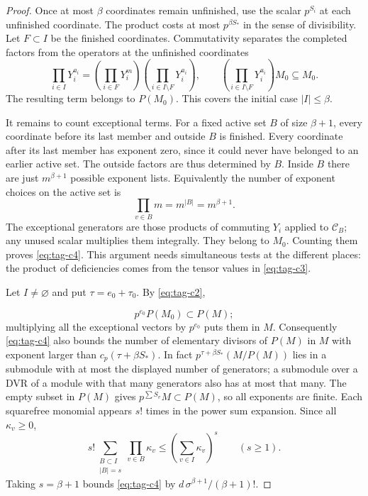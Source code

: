 \begin{proof}

Once at most \(\beta\) coordinates remain unfinished, use the
scalar \(p^{S_i}\) at each unfinished coordinate. The product
costs at most \(p^{\beta S_*}\) in the sense of divisibility.
Let \(F\subset I\) be the finished coordinates. Commutativity separates the completed factors from the operators at the unfinished coordinates
\[
  \prod_{i\in I}Y_i^{a_i}=\left(\prod_{i\in F}Y_i^m\right)\left(\prod_{i\in I\setminus F}Y_i^{a_i}\right),\qquad \left(\prod_{i\in I\setminus F}Y_i^{a_i}\right)M_0\subseteq M_0.
\]
 The resulting term belongs
to \(P(M_0)\). This covers the initial case \(|I|\le\beta\).


It remains to count exceptional terms. For a fixed active set \(B\)
of size \(\beta+1\), every coordinate before its last member and
outside \(B\) is finished. Every coordinate after its last member
has exponent zero, since it could never have belonged to an earlier
active set. The outside factors are thus determined by \(B\).
Inside \(B\) there are just \(m^{\beta+1}\) possible exponent lists.
Equivalently the number of exponent choices on the active set is
\[
  \prod_{v\in B}m=m^{|B|}=m^{\beta+1}.
\]
The exceptional generators are those products of commuting \(Y_i\)
applied to \(\mathcal C_B\); any unused scalar multiplies them
integrally. They belong to \(M_0\). Counting them proves \eqref{eq:tag-c4}.
This argument needs simultaneous tests at the different places:
the product of deficiencies comes from the tensor values in \eqref{eq:tag-c3}.

Let \(I\ne\varnothing\) and put \(\tau=e_0+\tau_0\). By \eqref{eq:tag-c2},

\[
  p^{e_0}P(M_0)\subset P(M);
\]
 multiplying all the exceptional
vectors by \(p^{e_0}\) puts them in \(M\). Consequently \eqref{eq:tag-c4}
also bounds the number of elementary divisors of \(P(M)\) in
\(M\) with exponent larger than \(c_p(\tau+\beta S_*)\).
In fact \(p^{\tau+\beta S_*}(M/P(M))\) lies in a submodule with
at most the displayed number of generators; a submodule over a DVR
of a module with that many generators also has at most that many.
The empty subset in \(P(M)\) gives \(p^{\sum S_v}M\subset P(M)\),
so all exponents are finite. Each squarefree monomial appears \(s!\) times in the power sum
expansion. Since all \(\kappa_v\ge0\),
\[
 s!\sum_{\substack{B\subset I\\|B|=s}}\prod_{v\in B}\kappa_v
              \le \left(\sum_{v\in I}\kappa_v\right)^s
                  \qquad(s\ge1).
\]
Taking \(s=\beta+1\) bounds \eqref{eq:tag-c4} by
\(d\,\sigma^{\beta+1}/(\beta+1)!\).

\end{proof}

